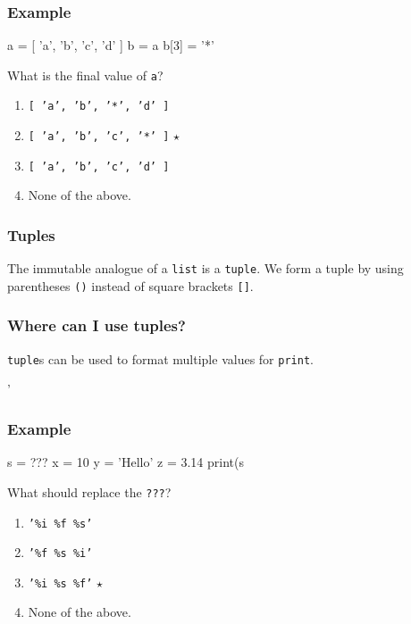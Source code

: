 \documentclass[11pt]{beamer}
\begin{document}
\begin{frame}[fragile]
  \frametitle{Example}
  \Enlarge

  \begin{semiverbatim}
a = [ 'a', 'b', 'c', 'd' ]
b = a
b[3] = '*'
  \end{semiverbatim}
  What is the final value of \texttt{a}?
  \begin{enumerate}[label=\Alph*]
  \item  \texttt{[ 'a', 'b', '*', 'd' ]}
  \item  \texttt{[ 'a', 'b', 'c', '*' ]}  $\star$
  \item  \texttt{[ 'a', 'b', 'c', 'd' ]}
  \item  None of the above.
  \end{enumerate}
\end{frame}

\begin{frame}[fragile]
  \frametitle{Tuples}
  \Enlarge

  \begin{itemize}
  \myitem  The immutable analogue of a \texttt{list} is a \texttt{tuple}. %
  \myitem  We form a tuple by using parentheses \texttt{()} instead of square brackets \texttt{[]}.
  \end{itemize}
\end{frame}

\begin{frame}[fragile]
  \frametitle{Where can I use tuples?}
  \Enlarge

  \begin{itemize}
  \myitem  \texttt{tuple}s can be used to format multiple values for \texttt{print}.
  \end{itemize}
  \begin{semiverbatim}
'%
  \end{semiverbatim}
\end{frame}

\begin{frame}[fragile]
  \frametitle{Example}
  \Enlarge

  \begin{semiverbatim}
s = ???
x = 10
y = 'Hello'
z = 3.14
print(s %
  \end{semiverbatim}
  What should replace the \texttt{???}?
  \begin{enumerate}[label=\Alph*]
  \item  \texttt{'\%i \%f \%s'}
  \item  \texttt{'\%f \%s \%i'}
  \item  \texttt{'\%i \%s \%f'}  $\star$
  \item  None of the above.
  \end{enumerate}
\end{frame}
\end{document}
